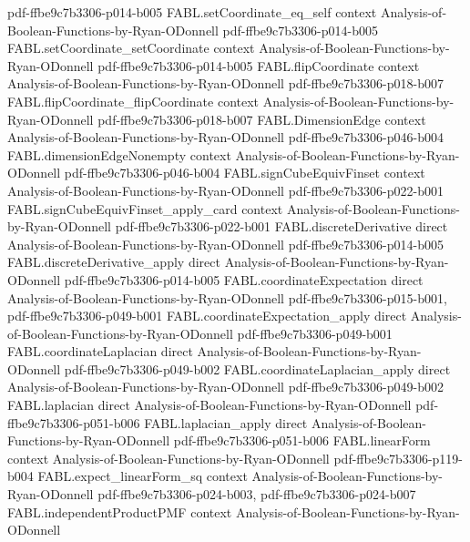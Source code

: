 \begin{theorem}
  {pdf-ffbe9c7b3306-p014-b005}
\proofstep
  {FABL.setCoordinate_eq_self}
  {context}
  {Analysis-of-Boolean-Functions-by-Ryan-ODonnell}
  {pdf-ffbe9c7b3306-p014-b005}
\proofstep
  {FABL.setCoordinate_setCoordinate}
  {context}
  {Analysis-of-Boolean-Functions-by-Ryan-ODonnell}
  {pdf-ffbe9c7b3306-p014-b005}
\proofstep
  {FABL.flipCoordinate}
  {context}
  {Analysis-of-Boolean-Functions-by-Ryan-ODonnell}
  {pdf-ffbe9c7b3306-p018-b007}
\proofstep
  {FABL.flipCoordinate_flipCoordinate}
  {context}
  {Analysis-of-Boolean-Functions-by-Ryan-ODonnell}
  {pdf-ffbe9c7b3306-p018-b007}
\proofstep
  {FABL.DimensionEdge}
  {context}
  {Analysis-of-Boolean-Functions-by-Ryan-ODonnell}
  {pdf-ffbe9c7b3306-p046-b004}
\proofstep
  {FABL.dimensionEdgeNonempty}
  {context}
  {Analysis-of-Boolean-Functions-by-Ryan-ODonnell}
  {pdf-ffbe9c7b3306-p046-b004}
\proofstep
  {FABL.signCubeEquivFinset}
  {context}
  {Analysis-of-Boolean-Functions-by-Ryan-ODonnell}
  {pdf-ffbe9c7b3306-p022-b001}
\proofstep
  {FABL.signCubeEquivFinset_apply_card}
  {context}
  {Analysis-of-Boolean-Functions-by-Ryan-ODonnell}
  {pdf-ffbe9c7b3306-p022-b001}
\proofstep
  {FABL.discreteDerivative}
  {direct}
  {Analysis-of-Boolean-Functions-by-Ryan-ODonnell}
  {pdf-ffbe9c7b3306-p014-b005}
\proofstep
  {FABL.discreteDerivative_apply}
  {direct}
  {Analysis-of-Boolean-Functions-by-Ryan-ODonnell}
  {pdf-ffbe9c7b3306-p014-b005}
\proofstep
  {FABL.coordinateExpectation}
  {direct}
  {Analysis-of-Boolean-Functions-by-Ryan-ODonnell}
  {pdf-ffbe9c7b3306-p015-b001,
    pdf-ffbe9c7b3306-p049-b001}
\proofstep
  {FABL.coordinateExpectation_apply}
  {direct}
  {Analysis-of-Boolean-Functions-by-Ryan-ODonnell}
  {pdf-ffbe9c7b3306-p049-b001}
\proofstep
  {FABL.coordinateLaplacian}
  {direct}
  {Analysis-of-Boolean-Functions-by-Ryan-ODonnell}
  {pdf-ffbe9c7b3306-p049-b002}
\proofstep
  {FABL.coordinateLaplacian_apply}
  {direct}
  {Analysis-of-Boolean-Functions-by-Ryan-ODonnell}
  {pdf-ffbe9c7b3306-p049-b002}
\proofstep
  {FABL.laplacian}
  {direct}
  {Analysis-of-Boolean-Functions-by-Ryan-ODonnell}
  {pdf-ffbe9c7b3306-p051-b006}
\proofstep
  {FABL.laplacian_apply}
  {direct}
  {Analysis-of-Boolean-Functions-by-Ryan-ODonnell}
  {pdf-ffbe9c7b3306-p051-b006}
\proofstep
  {FABL.linearForm}
  {context}
  {Analysis-of-Boolean-Functions-by-Ryan-ODonnell}
  {pdf-ffbe9c7b3306-p119-b004}
\proofstep
  {FABL.expect_linearForm_sq}
  {context}
  {Analysis-of-Boolean-Functions-by-Ryan-ODonnell}
  {pdf-ffbe9c7b3306-p024-b003,
    pdf-ffbe9c7b3306-p024-b007}
\proofstep
  {FABL.independentProductPMF}
  {context}
  {Analysis-of-Boolean-Functions-by-Ryan-ODonnell}

\end{theorem}
